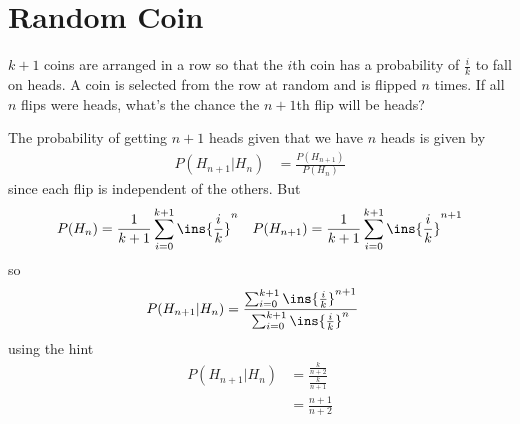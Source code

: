 \clearpage
\section{Random Coin}
\begin{colbox}
\(k+1\) coins are arranged in a row so that the \(i\)th coin has a probability of \(\frac{i}{k}\) to fall on heads. A coin is selected from the row at random and is flipped \(n\) times. If all \(n\) flips were heads, what's the chance the \(n+1\)th flip will be heads?
\end{colbox}
The probability of getting \(n+1\) heads given that we have \(n\) heads is given by
\begin{align}
    P(H_{n+1}|H_{n}) &= \frac{P(H_{n+1})}{P(H_{n})}
\end{align}
since each flip is independent of the others. But
\begin{align}
    P(H_{n}) = \frac{1}{k+1}\sum_{i=0}^{k+1}\ins{\frac{i}{k}}^n && P(H_{n+1}) = \frac{1}{k+1}\sum_{i=0}^{k+1}\ins{\frac{i}{k}}^{n+1}
\end{align}
so
\begin{align}
    P(H_{n+1}|H_{n}) &= \frac{\sum_{i=0}^{k+1}\ins{\frac{i}{k}}^{n+1}}{\sum_{i=0}^{k+1}\ins{\frac{i}{k}}^n}
\end{align}
using the hint
\begin{align}
    P(H_{n+1}|H_{n}) &= \frac{\frac{k}{n+2}}{\frac{k}{n+1}} \\
    &= \frac{n+1}{n+2}
\end{align}
